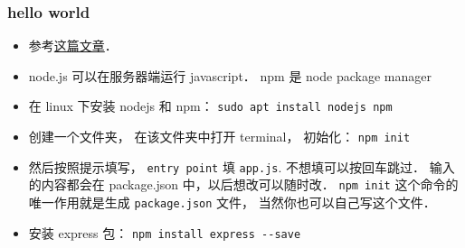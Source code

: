 
\begin{issues}
\issueDraft
\end{issues}


\subsubsection{hello world}
\begin{itemize}
\item 参考\href{https://medium.com/@adnanrahic/hello-world-app-with-node-js-and-express-c1eb7cfa8a30}{这篇文章}．
\item node.js 可以在服务器端运行 javascript． npm 是 node package manager
\item 在 linux 下安装 nodejs 和 npm： \verb|sudo apt install nodejs npm|
\item 创建一个文件夹， 在该文件夹中打开 terminal， 初始化： \verb|npm init|
\item 然后按照提示填写， \verb|entry point| 填 \verb`app.js`. 不想填可以按回车跳过． 输入的内容都会在 package.json 中，以后想改可以随时改． \verb|npm init| 这个命令的唯一作用就是生成 \verb`package.json` 文件， 当然你也可以自己写这个文件．
\item 安装 express 包： \verb|npm install express --save|
\end{itemize}
